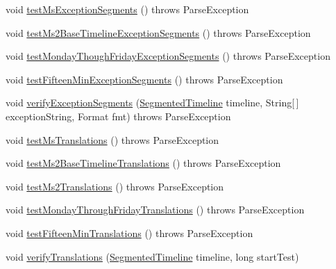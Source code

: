 \begin{DoxyCompactItemize}
void \mbox{\hyperlink{classorg_1_1jfree_1_1chart_1_1axis_1_1_segmented_timeline_test_a6d70931957494cc07d7abf2c46293373}{test\+Ms\+Exception\+Segments}} ()  throws Parse\+Exception 
\item 
void \mbox{\hyperlink{classorg_1_1jfree_1_1chart_1_1axis_1_1_segmented_timeline_test_a5ea4f6b57bda8b36763afb7adedf920a}{test\+Ms2\+Base\+Timeline\+Exception\+Segments}} ()  throws Parse\+Exception 
\item 
void \mbox{\hyperlink{classorg_1_1jfree_1_1chart_1_1axis_1_1_segmented_timeline_test_a0326227da2ad9e346397a0a663422ab4}{test\+Monday\+Though\+Friday\+Exception\+Segments}} ()  throws Parse\+Exception 
\item 
void \mbox{\hyperlink{classorg_1_1jfree_1_1chart_1_1axis_1_1_segmented_timeline_test_a180281fb1a5a701ab4621f3e99918297}{test\+Fifteen\+Min\+Exception\+Segments}} ()  throws Parse\+Exception 
\item 
void \mbox{\hyperlink{classorg_1_1jfree_1_1chart_1_1axis_1_1_segmented_timeline_test_ae56b03cb944a7f486e2bba786e24eb5a}{verify\+Exception\+Segments}} (\mbox{\hyperlink{classorg_1_1jfree_1_1chart_1_1axis_1_1_segmented_timeline}{Segmented\+Timeline}} timeline, String\mbox{[}$\,$\mbox{]} exception\+String, Format fmt)  throws Parse\+Exception 
\item 
void \mbox{\hyperlink{classorg_1_1jfree_1_1chart_1_1axis_1_1_segmented_timeline_test_a3e07edd28906914d584b7be675f4cb68}{test\+Ms\+Translations}} ()  throws Parse\+Exception 
\item 
void \mbox{\hyperlink{classorg_1_1jfree_1_1chart_1_1axis_1_1_segmented_timeline_test_a2c95baba193dbccb230f5c156e765b2e}{test\+Ms2\+Base\+Timeline\+Translations}} ()  throws Parse\+Exception 
\item 
void \mbox{\hyperlink{classorg_1_1jfree_1_1chart_1_1axis_1_1_segmented_timeline_test_ac242b818899caa2b548f595e605859b7}{test\+Ms2\+Translations}} ()  throws Parse\+Exception 
\item 
void \mbox{\hyperlink{classorg_1_1jfree_1_1chart_1_1axis_1_1_segmented_timeline_test_abc0b1528f37cadb99956e7ecfb43524b}{test\+Monday\+Through\+Friday\+Translations}} ()  throws Parse\+Exception 
\item 
void \mbox{\hyperlink{classorg_1_1jfree_1_1chart_1_1axis_1_1_segmented_timeline_test_a82a12e0a01df4a7fb43ec951a3afe6d7}{test\+Fifteen\+Min\+Translations}} ()  throws Parse\+Exception 
\item 
void \mbox{\hyperlink{classorg_1_1jfree_1_1chart_1_1axis_1_1_segmented_timeline_test_ae041ea6c1b16ef5ae52793fea92bccec}{verify\+Translations}} (\mbox{\hyperlink{classorg_1_1jfree_1_1chart_1_1axis_1_1_segmented_timeline}{Segmented\+Timeline}} timeline, long start\+Test)

\end{DoxyCompactItemize}
